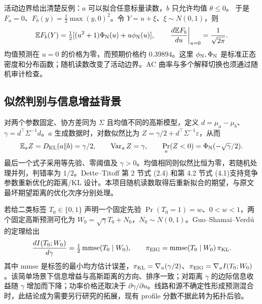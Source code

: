 \documentclass[UTF8,fontset=fandol,11pt,a4paper]{ctexart}
\newcommand{\KL}{D_{\mathrm{KL}}}
\begin{document}
活动边界给出清楚反例：$a$ 可以拟合任意标量读数，$b$ 只允许均值 $\theta\le0$。
于是 $F_a=0$、$F_b(y)=\tfrac12\max(y,0)^2$。令 $Y=u+\xi$、$\xi\sim N(0,1)$，则
\begin{equation}
\mathbb EF_b(Y)=\tfrac12[(u^2+1)\Phi_{\rm N}(u)+u\phi_{\rm N}(u)],\qquad
\left.\frac{d\mathbb EF_b}{du}\right|_{u=0}=\frac1{\sqrt{2\pi}}.
\label{eq:gp-boundary}
\end{equation}
均值预测在 $u=0$ 的价格为零，而预期价格约 $0.39894$。这里 $\phi_{\rm N},\Phi_{\rm N}$ 是标准正态密度和分布函数；随机读数改变了活动边界。AC 曲率与多个解释切换也须通过随机审计检查。

\subsection{似然判别与信息增益背景}
对两个参数固定、协方差同为 $\Sigma$ 且均值不同的高斯模型，定义
$d=\mu_a-\mu_b$、$\gamma=d^\top\Sigma^{-1}d$。$a$ 生成数据时，对数似然比为
$Z=\gamma/2+d^\top\Sigma^{-1}\varepsilon$，从而
\begin{equation}
\mathbb E_aZ=\KL(a\Vert b)=\gamma/2,\qquad
\operatorname{Var}_aZ=\gamma,\qquad
\Pr_a(Z<0)=\Phi_{\rm N}(-\sqrt\gamma/2).
\label{eq:gp-gaussian}
\end{equation}
最后一个式子采用等先验、零阈值及 $\gamma>0$。均值相同则似然比恒为零，若随机处理并列，判错率为 $1/2$。Dette--Titoff 第 2 节式 (2.4) 和第 4.2 节式 (4.1)支持竞争参数重新优化的距离/KL 设计\cite{dette}。本项目随机读数取得后重新拟合的期望，与原文最坏期望距离的优化次序分别处理。

若给二类标签 $T_0\in\{0,1\}$ 声明一个固定先验 $\Pr(T_0=1)=w$、$0<w<1$，两个固定高斯预测可化为
$W_0=\sqrt\gamma T_0+N_0$，$N_0\sim N(0,1)$。Guo--Shamai--Verd\'u 的定理\cite{gp-guo}给出
\begin{equation}
\frac{d I(T_0;W_0)}{d\gamma}=\tfrac12\operatorname{mmse}(T_0\mid W_0),
\qquad
\pi_{\rm EIG}=\operatorname{mmse}(T_0\mid W_0)\,\pi_{\rm KL}.
\label{eq:gp-immse}
\end{equation}
其中 mmse 是标签的最小均方估计误差，$\pi_{\rm KL}=\nabla_u(\gamma/2)$、$\pi_{\rm EIG}=\nabla_u I(T_0;W_0)$。该简单场景下信息增益与高斯距离的方向、排序一致；对距离 $\gamma$ 的边际信息收益随 $\gamma$ 增加而下降；功率价格还取决于 $\partial\gamma/\partial u$。线路和源不确定性形成预测混合时，此结论成为需要另行研究的拓展，现有 profile 分数不据此转为拓扑后验。
\end{document}
